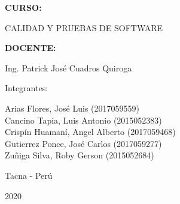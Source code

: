 \documentclass[12pt,letterpaper]{article}
\begin{document}
\begin{titlepage}
\begin{center}
\vspace*{0.3in}
\begin{Large}
\textbf{CURSO:} \\
\end{Large}

\vspace*{0.1in}
\begin{large}
CALIDAD Y PRUEBAS DE SOFTWARE\\
\end{large}

\vspace*{0.3in}
\begin{Large}
\textbf{DOCENTE:} \\
\end{Large}

\vspace*{0.1in}
\begin{large}
Ing. Patrick José Cuadros Quiroga\\
\end{large}

\vspace*{0.2in}
\vspace*{0.1in}
\begin{large}
Integrantes: \\
\begin{flushleft}
Arias Flores, José Luis 			\hfill	(2017059559) \\
Cancino Tapia, Luis Antonio 		\hfill	(2015052383) \\
Crispín Huamaní, Angel Alberto      \hfill	(2017059468) \\
Gutierrez Ponce, José Carlos  		\hfill	(2017059277) \\
Zuñiga Silva, Roby Gerson       	\hfill	(2015052684) \\

\end{flushleft}
\end{large}
\vspace*{0.1in}
\begin{large}
Tacna - Perú\\
\end{large}
\vspace*{0.1in}
\begin{large}
2020\\
\end{large}

\end{center}

\end{titlepage}


\end{document}

